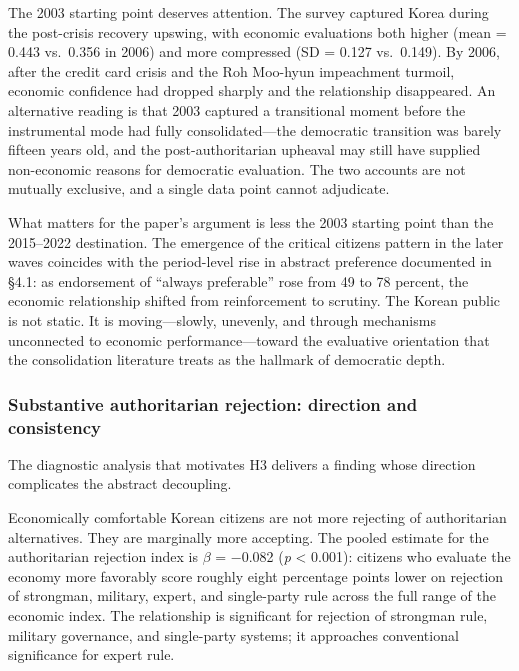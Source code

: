 \documentclass[
  12pt,
  12pt,
  letterpaper]{article}
\begin{document}
The 2003 starting point deserves attention. The survey captured Korea
during the post-crisis recovery upswing, with economic evaluations both
higher (mean = 0.443 vs.~0.356 in 2006) and more compressed (SD = 0.127
vs.~0.149). By 2006, after the credit card crisis and the Roh Moo-hyun
impeachment turmoil, economic confidence had dropped sharply and the
relationship disappeared. An alternative reading is that 2003 captured a
transitional moment before the instrumental mode had fully
consolidated---the democratic transition was barely fifteen years old,
and the post-authoritarian upheaval may still have supplied non-economic
reasons for democratic evaluation. The two accounts are not mutually
exclusive, and a single data point cannot adjudicate.

What matters for the paper's argument is less the 2003 starting point
than the 2015--2022 destination. The emergence of the critical citizens
pattern in the later waves coincides with the period-level rise in
abstract preference documented in §4.1: as endorsement of ``always
preferable'' rose from 49 to 78 percent, the economic relationship
shifted from reinforcement to scrutiny. The Korean public is not static.
It is moving---slowly, unevenly, and through mechanisms unconnected to
economic performance---toward the evaluative orientation that the
consolidation literature treats as the hallmark of democratic depth.

\subsubsection{Substantive authoritarian rejection: direction and
consistency}\label{substantive-authoritarian-rejection-direction-and-consistency}

The diagnostic analysis that motivates H3 delivers a finding whose
direction complicates the abstract decoupling.

Economically comfortable Korean citizens are not more rejecting of
authoritarian alternatives. They are marginally more accepting. The
pooled estimate for the authoritarian rejection index is \(\beta\) =
−0.082 (\emph{p} \textless{} 0.001): citizens who evaluate the economy
more favorably score roughly eight percentage points lower on rejection
of strongman, military, expert, and single-party rule across the full
range of the economic index. The relationship is significant for
rejection of strongman rule, military governance, and single-party
systems; it approaches conventional significance for expert rule.
\end{document}
